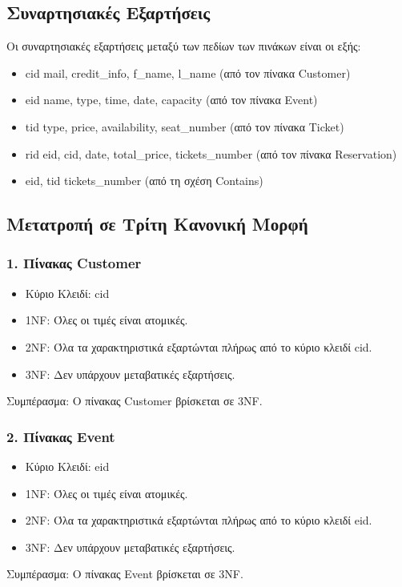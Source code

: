 \documentclass[a4paper, 11pt]{article}
\begin{document}
\subsection*{Συναρτησιακές Εξαρτήσεις}
Οι συναρτησιακές εξαρτήσεις μεταξύ των πεδίων των πινάκων είναι οι εξής:
\begin{itemize}
    \item cid \rightarrow mail, credit\_info, f\_name, l\_name (από τον πίνακα Customer)
    \item eid \rightarrow name, type, time, date, capacity (από τον πίνακα Event)
    \item tid \rightarrow type, price, availability, seat\_number (από τον πίνακα Ticket)
    \item rid \rightarrow eid, cid, date, total\_price, tickets\_number (από τον πίνακα Reservation)
    \item eid, tid \rightarrow tickets\_number (από τη σχέση Contains)
\end{itemize}

\subsection*{Μετατροπή σε Τρίτη Κανονική Μορφή}
\subsubsection*{1. Πίνακας Customer}
\begin{itemize}
    \item Κύριο Κλειδί: cid
    \item 1NF: Όλες οι τιμές είναι ατομικές.
    \item 2NF: Όλα τα χαρακτηριστικά εξαρτώνται πλήρως από το κύριο κλειδί cid.
    \item 3NF: Δεν υπάρχουν μεταβατικές εξαρτήσεις.
\end{itemize}
Συμπέρασμα: Ο πίνακας Customer βρίσκεται σε 3NF.

\subsubsection*{2. Πίνακας Event}
\begin{itemize}
    \item Κύριο Κλειδί: eid
    \item 1NF: Όλες οι τιμές είναι ατομικές.
    \item 2NF: Όλα τα χαρακτηριστικά εξαρτώνται πλήρως από το κύριο κλειδί eid.
    \item 3NF: Δεν υπάρχουν μεταβατικές εξαρτήσεις.
\end{itemize}
Συμπέρασμα: Ο πίνακας Event βρίσκεται σε 3NF.
\end{document}

